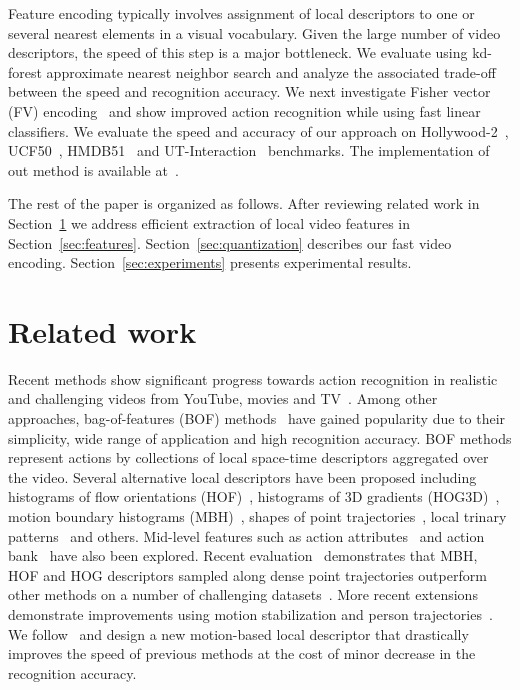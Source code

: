 \documentclass[10pt,twocolumn,letterpaper]{article}
\begin{document}
Feature encoding typically involves assignment of local
descriptors to one or several nearest elements in a visual
vocabulary. Given the large number of video descriptors, the
speed of this step is a major bottleneck. We evaluate using
kd-forest approximate nearest neighbor search \cite{Philbin07}
and analyze the associated trade-off between the speed and
recognition accuracy. We next investigate Fisher vector (FV)
encoding~\cite{Perronnin12} and show improved action recognition while using fast linear classifiers.
We evaluate the speed and accuracy of our approach on
\mbox{Hollywood-2}~\cite{Marszalek09}, UCF50~\cite{Reddy12},
HMDB51~\cite{Kuehne11} and UT-Interaction~\cite{Ryoo10}
benchmarks. The implementation of out method is available at~\cite{projectpage}.

The rest of the paper is organized as follows. 
After reviewing related work in Section~\ref{sec:relatedwork} we address efficient extraction of local video features in
Section~\ref{sec:features}. Section~\ref{sec:quantization}
describes our fast video encoding.
Section~\ref{sec:experiments} presents experimental results.



\section{Related work}
\label{sec:relatedwork}
Recent methods show significant progress towards action
recognition in realistic and challenging videos from YouTube,
movies and
TV~\cite{Laptev08,Laptev07,Liu11,Niebles10,Rodriguez08,Sadanand12,Wang12}.
Among other approaches, bag-of-features (BOF)
methods~\cite{Dollar05,Laptev05,Schuldt04} have gained
popularity due to their simplicity, wide range of application
and high recognition accuracy.
BOF methods represent actions by collections of local space-time descriptors aggregated over the video.
Several alternative local descriptors have been proposed
including histograms of flow orientations (HOF)~\cite{Laptev08},
histograms of 3D gradients
(HOG3D)~\cite{klaser2008spatio,Scovanner07}, motion boundary
histograms (MBH)~\cite{Dalal06,Wang12}, shapes of point
trajectories~\cite{Matikainen09,Messing09,Wang12}, local trinary patterns~\cite{Kliper12,Yeffet09} and others. 
Mid-level features such as action attributes~\cite{Liu11} and action
bank~\cite{Sadanand12} have also been explored. Recent
 evaluation~\cite{Wang12} demonstrates that MBH, HOF
and HOG descriptors sampled along dense point trajectories
outperform other
methods on a number of challenging datasets~\cite{Wang12}. 
More recent extensions demonstrate improvements using motion stabilization and person trajectories~\cite{Jain13,Wang13}.
We follow~\cite{Wang12} and design a new motion-based local
descriptor that drastically improves the speed of previous
methods at the cost of minor decrease in the recognition
accuracy.
\end{document}
